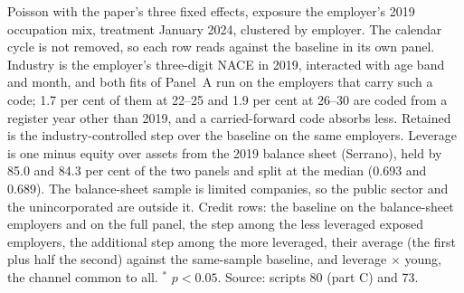 \begin{table}[ht!]
\begin{minipage}{0.9\textwidth}
Poisson with the paper's three fixed effects, exposure the employer's 2019 occupation mix, treatment January 2024, clustered by employer. The calendar cycle is not removed, so each row reads against the baseline in its own panel. Industry is the employer's three-digit NACE in 2019, interacted with age band and month, and both fits of Panel~A run on the employers that carry such a code; 1.7 per cent of them at 22--25 and 1.9 per cent at 26--30 are coded from a register year other than 2019, and a carried-forward code absorbs less. Retained is the industry-controlled step over the baseline on the same employers. Leverage is one minus equity over assets from the 2019 balance sheet (Serrano), held by 85.0 and 84.3 per cent of the two panels and split at the median (0.693 and 0.689). The balance-sheet sample is limited companies, so the public sector and the unincorporated are outside it. Credit rows: the baseline on the balance-sheet employers and on the full panel, the step among the less leveraged exposed employers, the additional step among the more leveraged, their average (the first plus half the second) against the same-sample baseline, and leverage $\times$ young, the channel common to all. $^{*}$ $p<0.05$. Source: scripts 80 (part C) and 73.
\end{minipage}
\end{table}
